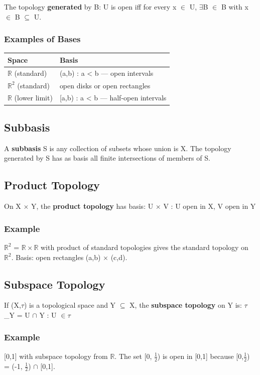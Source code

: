 \documentclass[12pt,a4paper,openany]{book}
\begin{document}
{{The topology \textbf{generated} by B: U is open iff for every x $\in$ U, $\exists$B $\in$ B with x $\in$ B $\subseteq$ U.

\subsubsection{Examples of Bases}
\begin{center}
\begin{tabular}{|l|l|}
\hline
\textbf{Space} & \textbf{Basis} \\
\hline
$\mathbb{R}$ (standard) & {(a,b) : a < b} — open intervals \\
\hline
$\mathbb{R}^2$ (standard) & {open disks} or {open rectangles} \\
\hline
$\mathbb{R}$ (lower limit) & {[a,b) : a < b} — half-open intervals \\
\hline
\end{tabular}
\end{center}

\subsection{Subbasis}
A \textbf{subbasis} S is any collection of subsets whose union is X. The topology generated by S has as basis all finite intersections of members of S.

\subsection{Product Topology }
On X $\times$ Y, the \textbf{product topology} has basis: {U $\times$ V : U open in X, V open in Y}

\subsubsection{Example}
$\mathbb{R}^2$ = $\mathbb{R}\times\mathbb{R}$ with product of standard topologies gives the standard topology on $\mathbb{R}^2$.
Basis: open rectangles (a,b) $\times$ (c,d).

\subsection{Subspace Topology}
If (X,$\tau$) is a topological space and Y $\subseteq$ X, the \textbf{subspace topology} on Y is:
$\tau$_Y = {U $\cap$ Y : U $\in\tau$}

\subsubsection{Example}
[0,1] with subspace topology from $\mathbb{R}$. The set [0, $\frac{1}{2}$) is open in [0,1] because [0,$\frac{1}{2}$) = (-1, $\frac{1}{2}$) $\cap$ [0,1].

}}
\end{document}
